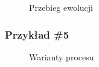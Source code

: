 \begin{figure}[!ht]
	\caption{\label{fig:flow_chart}Przebieg ewolucji}
\end{figure}

\subsubsection{Przykład \#5}
\begin{figure}[!ht]
	\caption{\label{fig:flow_chart}Warianty procesu}
\end{figure}

